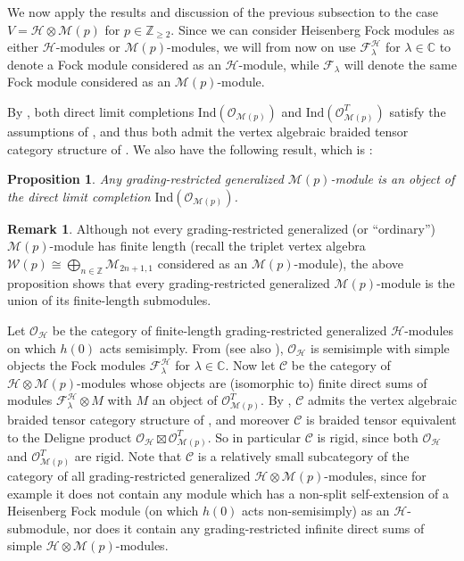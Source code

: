 \documentclass[11pt, reqno]{amsart}
\newtheorem{prop}[thm]{Proposition}
\theoremstyle{definition}\newtheorem{defi}[thm]{Definition}
\theoremstyle{definition}\newtheorem{rem}[thm]{Remark}
\theoremstyle{definition}\newtheorem{exam}[thm]{Example}
\theoremstyle{definition}\newtheorem{assum}[thm]{Assumption}
\newcommand{\cH}{\mathcal{H}}
\newcommand{\cM}{\mathcal{M}}
\newcommand{\cF}{\mathcal{F}}
\newcommand{\cO}{\mathcal{O}}
\newcommand{\cC}{\mathcal{C}}
\newcommand{\cW}{\mathcal{W}}
\newcommand{\CC}{\mathbb{C}}
\newcommand{\ZZ}{\mathbb{Z}}
\newcommand{\ind}{\mathrm{Ind}}
\begin{document}
We now apply the results and discussion of the previous subsection to the case $V=\cH\otimes\cM(p)$ for $p\in\ZZ_{\geq 2}$.  Since we can consider Heisenberg Fock modules as either $\cH$-modules or $\cM(p)$-modules, we will from now on use $\cF^\cH_\lambda$ for $\lambda\in\CC$ to denote a Fock module considered as an $\cH$-module, while $\cF_\lambda$ will denote the same Fock module considered as an $\cM(p)$-module. 



 By \cite[Proposition 6.1]{CMY-singlet-typical}, both direct limit completions $\ind(\cO_{\cM(p)})$ and $\ind(\cO_{\cM(p)}^T)$ satisfy the assumptions of \cite[Theorem 1.1]{CMY-completions}, and thus both admit the vertex algebraic braided tensor category structure of \cite{HLZ8}. We also have the following result, which is \cite[Proposition 6.2]{CMY-singlet-typical}:
\begin{prop}\label{prop:gen_Mp_mod_in_DLC}
 Any grading-restricted generalized $\cM(p)$-module is an object of the direct limit completion $\ind(\cO_{\cM(p)})$.
\end{prop}

\begin{rem}
Although not every grading-restricted generalized (or ``ordinary'') $\cM(p)$-module has finite length (recall the triplet vertex algebra $\cW(p)\cong\bigoplus_{n\in\ZZ} \cM_{2n+1,1}$ considered as an $\cM(p)$-module), the above proposition shows that every grading-restricted generalized $\cM(p)$-module is the union of its finite-length submodules.
\end{rem}

 Let $\mathcal{O}_{\mathcal{H}}$ be the category of finite-length grading-restricted generalized $\cH$-modules on which $h(0)$ acts semisimply. From \cite[Theorem 1.7.3]{FLM} (see also \cite[Lemma 2.1]{M}), $\cO_{\cH}$ is semisimple with simple objects the Fock modules $\cF_{\lambda}^{\cH}$ for $\lambda \in \mathbb{C}$. Now let $\cC$ be the category of $\cH\otimes\cM(p)$-modules whose objects are (isomorphic to) finite direct sums of modules $\cF^\cH_\lambda\otimes M$ with $M$ an object of $\cO^T_{\cM(p)}$. By \cite[Theorems 5.2 and 5.5]{CKM2}, $\cC$ admits the vertex algebraic braided tensor category structure of \cite{HLZ8}, and moreover $\cC$ is braided tensor equivalent to the Deligne product $\cO_{\cH} \boxtimes \cO_{\cM(p)}^T$. So in particular $\cC$ is rigid, since both $\cO_\cH$ and $\cO_{\cM(p)}^T$ are rigid. Note that $\cC$ is a relatively small subcategory of the category of all grading-restricted generalized $\cH\otimes\cM(p)$-modules, since for example it does not contain any module which has a non-split self-extension of a Heisenberg Fock module (on which $h(0)$ acts non-semisimply) as an $\cH$-submodule, nor does it contain any grading-restricted infinite direct sums of simple $\cH\otimes\cM(p)$-modules.
\end{document}
